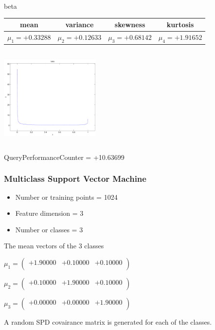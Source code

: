 \documentclass[9pt]{article}
\theoremstyle{plain}
\theoremstyle{definition}
\theoremstyle{remark}
\numberwithin{equation}{section}
\begin{document}
\newpage
beta \begin{tabular}{|c|c|c|c|}  mean & variance & skewness & kurtosis \\  \hline
$\mu_1 = +0.33288$ & $\mu_2 = +0.12633$ & $\mu_3 = +0.68142$ & $\mu_4 =+1.91652$ \\
\end{tabular}

\includegraphics[width=5cm,height=5cm]{beta.pdf}

QueryPerformanceCounter  =  +10.63699
\subsubsection{Multiclass Support Vector Machine }
\begin{itemize}
\item Number or training points = 1024
\item Feature dimension = 3
\item Number or classes = 3
\end{itemize}
{The mean vectors of the 3 classes}

$\mu_1 = \left(
\begin{array}{
ccc}
+1.90000 & +0.10000 & +0.10000 \\
\end{array}
\right)$ \newline 

$\mu_2 = \left(
\begin{array}{
ccc}
+0.10000 & +1.90000 & +0.10000 \\
\end{array}
\right)$ \newline 

$\mu_3 = \left(
\begin{array}{
ccc}
+0.00000 & +0.00000 & +1.90000 \\
\end{array}
\right)$ \newline 

A random SPD covairance matrix is generated for each of the classes.\newline
\end{document}
